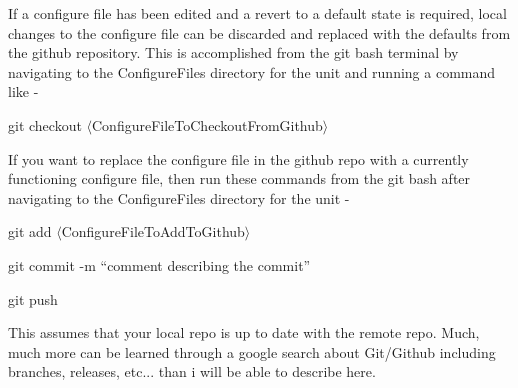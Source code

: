 If a configure file has been edited and a revert to a default state is required, local changes to the configure file can be discarded and replaced with the defaults from the github repository. This is accomplished from the git bash terminal by navigating to the ConfigureFiles directory for the unit and running a command like - 

git checkout $ \langle $ConfigureFileToCheckoutFromGithub$ \rangle $  

If you want to replace the configure file in the github repo with a currently functioning configure file, then run these commands from the git bash after navigating to the ConfigureFiles directory for the unit - 

git add $ \langle $ConfigureFileToAddToGithub$ \rangle $ 

git commit -m ``comment describing the commit''

git push

This assumes that your local repo is up to date with the remote repo. Much, much more can be learned through a google search about Git/Github including branches, releases, etc... than i will be able to describe here. 

